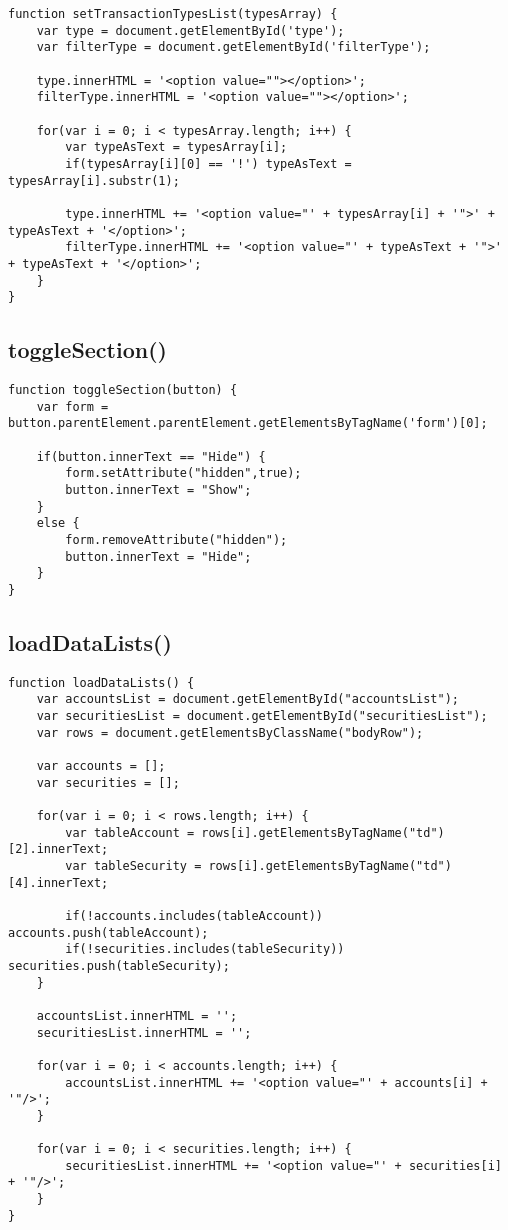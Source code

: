 \documentclass[letterpaper]{article}
\begin{document}
\begin{lstlisting}[firstnumber=677]
function setTransactionTypesList(typesArray) {
    var type = document.getElementById('type');
    var filterType = document.getElementById('filterType');

    type.innerHTML = '<option value=""></option>';
    filterType.innerHTML = '<option value=""></option>';

    for(var i = 0; i < typesArray.length; i++) {
        var typeAsText = typesArray[i];
        if(typesArray[i][0] == '!') typeAsText = typesArray[i].substr(1);

        type.innerHTML += '<option value="' + typesArray[i] + '">' + typeAsText + '</option>';
        filterType.innerHTML += '<option value="' + typeAsText + '">' + typeAsText + '</option>';
    }
}
\end{lstlisting}

\subsection{toggleSection()}

\begin{lstlisting}[firstnumber=693]
function toggleSection(button) {
    var form = button.parentElement.parentElement.getElementsByTagName('form')[0];

    if(button.innerText == "Hide") {
        form.setAttribute("hidden",true);
        button.innerText = "Show";
    }
    else {
        form.removeAttribute("hidden");
        button.innerText = "Hide";
    }
}
\end{lstlisting}

\subsection{loadDataLists()}

\begin{lstlisting}[firstnumber=706]
function loadDataLists() {
    var accountsList = document.getElementById("accountsList");
    var securitiesList = document.getElementById("securitiesList");
    var rows = document.getElementsByClassName("bodyRow");

    var accounts = [];
    var securities = [];

    for(var i = 0; i < rows.length; i++) {
        var tableAccount = rows[i].getElementsByTagName("td")[2].innerText;
        var tableSecurity = rows[i].getElementsByTagName("td")[4].innerText;

        if(!accounts.includes(tableAccount)) accounts.push(tableAccount);
        if(!securities.includes(tableSecurity)) securities.push(tableSecurity);
    }

    accountsList.innerHTML = '';
    securitiesList.innerHTML = '';

    for(var i = 0; i < accounts.length; i++) {
        accountsList.innerHTML += '<option value="' + accounts[i] + '"/>';
    }

    for(var i = 0; i < securities.length; i++) {
        securitiesList.innerHTML += '<option value="' + securities[i] + '"/>';
    }
}
\end{lstlisting}
\end{document}
